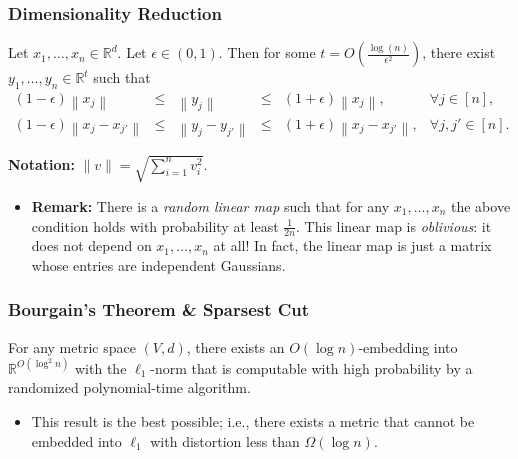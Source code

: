 \documentclass{beamer}
\newcommand{\RR}{\mathbb{R}}
\begin{document}
    \begin{frame}
        \frametitle{Dimensionality Reduction}
    
        \begin{theorem}
            Let $x_1, \ldots, x_n \in \RR^d$. Let $\epsilon \in (0, 1)$. Then for some $t = O(\frac{\log(n)}{\epsilon^2})$, there exist $y_1, \ldots, y_n \in \RR^t$ such that
            {\small
                $$
                \begin{array}{rcccll}
                    (1 - \epsilon) \left\lVert x_j \right\rVert & \leq & \left\lVert y_j \right\rVert & \leq & (1 + \epsilon) \left\lVert x_j \right\rVert, & \forall j \in [n], \\
                    (1 - \epsilon) \left\lVert x_j - x_{j'} \right\rVert & \leq & \left\lVert y_j - y_{j'} \right\rVert & \leq & (1 + \epsilon) \left\lVert x_j - x_{j'} \right\rVert, & \forall j, j' \in [n].
                \end{array}
                $$
            }

            \vspace{-1em}
            {\bf Notation:} $\lVert v \rVert = \sqrt{\sum_{i = 1}^n v_i^2}$.
        \end{theorem}

        \pause

        \begin{itemize}
            \item {\bf Remark:} There is a \emph{random linear map} such that for any $x_1, \ldots, x_n$ the above condition holds with probability at least $\frac{1}{2n}$. This linear map is \emph{oblivious}: it does not depend on $x_1, \ldots, x_n$ at all! In fact, the linear map is just a matrix whose entries are independent Gaussians.
        \end{itemize}
    \end{frame}

    \begin{frame}
        \frametitle{Bourgain's Theorem \& {\sc Sparsest Cut}}
    
        \begin{theorem}
            For any metric space $(V, d)$, there exists an $O(\log n)$-embedding into $\RR^{O(\log^2 n)}$ with the $\ell_1$-norm that is computable with high probability by a randomized polynomial-time algorithm.
        \end{theorem}

        \pause

        \begin{itemize}
            \item This result is the best possible; i.e., there exists a metric that cannot be embedded into $\ell_1$ with distortion less than $\Omega(\log n)$.
        \end{itemize}
    \end{frame}
\end{document}
